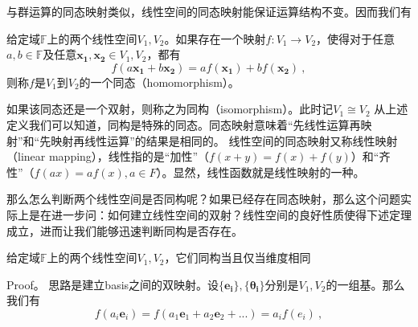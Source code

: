 

与群运算的同态映射类似，线性空间的同态映射能保证运算结构不变。因而我们有
\begin{definition}{}
给定域$\mathbb F$上的两个线性空间$V_1,V_2$。如果存在一个映射$f:V_1\rightarrow V_2$，使得对于任意$a,b\in \mathbb F$及任意$\boldsymbol{x_1,x_2}\in V_1,V_2$，都有
\begin{equation}
f(a\boldsymbol {x_1}+b\boldsymbol {x_2})=af(\boldsymbol {x_1})+bf(\boldsymbol {x_2})~,
\end{equation}
则称$f$是$V_1$到$V_2$的一个同态（homomorphism）。
\end{definition}
如果该同态还是一个双射，则称之为同构（isomorphism）。此时记$V_1\cong V_2$
从上述定义我们可以知道，同构是特殊的同态。同态映射意味着“先线性运算再映射”和“先映射再线性运算”的结果是相同的。
线性空间的同态映射又称线性映射（linear mapping），线性指的是“加性”（$f(x+y)=f(x)+f(y)$）和“齐性”（$f(ax)=af(x),a\in F$）。显然，线性函数就是线性映射的一种。

那么怎么判断两个线性空间是否同构呢？如果已经存在同态映射，那么这个问题实际上是在进一步问：如何建立线性空间的双射？线性空间的良好性质使得下述定理成立，进而让我们能够迅速判断同构是否存在。
\begin{theorem}{}
给定域$\mathbb F$上的两个线性空间$V_1,V_2$，它们同构当且仅当维度相同
\end{theorem}
Proof。
思路是建立basis之间的双映射。设$\{\boldsymbol{e_i}\},\{\boldsymbol{\theta_i}\}$分别是$V_1,V_2$的一组基。那么我们有
\begin{equation}
f(a_i\boldsymbol e_i)=f(a_1\boldsymbol e_1+a_2\boldsymbol e_2+...)=a_if(e_i)~,
\end{equation}